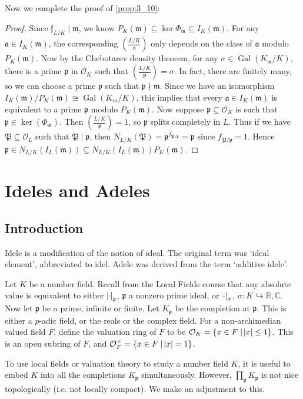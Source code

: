\documentclass[11pt]{article}
\theoremstyle{definition}
\theoremstyle{plain}
\theoremstyle{remark}
\DeclareMathOperator{\Gal}{Gal}
\newcommand{\RR}{\mathbb{R}}
\newcommand{\CC}{\mathbb{C}}
\newcommand{\cO}{\mathcal{O}}
\newcommand{\cp}{\mathfrak{P}}
\newcommand{\fa}{\mathfrak{a}}
\newcommand{\ff}{\mathfrak{f}}
\newcommand{\fp}{\mathfrak{p}}
\newcommand{\fm}{\mathfrak{m}}
\newcommand{\leg}[2]{\left(\frac{#1}{#2}\right)}
\begin{document}
Now we complete the proof of \autoref{prop:3_10}:
\begin{proof}
    Since $\ff_{L/K} \mid \fm$, we know $P_K(\fm) \subseteq \ker \Phi_\fm \subseteq I_K(\fm)$. For any $\fa \in I_K(\fm)$, the corresponding $\leg{L/K}{\fa}$ only depends on the class of $\fa$ modulo $P_K(\fm)$. Now by the Chebotarev density theorem, for any $\sigma \in \Gal(K_\fm / K)$, there is a prime $\fp$ in $\cO_K$ such that $\leg{L/K}{\fp} = \sigma$. In fact, there are finitely many, so we can choose a prime $\fp$ such that $\fp \nmid \fm$. Since we have an isomorphism $I_K(\fm) / P_K(\fm) \cong \Gal(K_m / K)$, this implies that every $\fa \in I_K(\fm)$ is equivalent to a prime $\fp$ modulo $P_K(\fm)$. Now suppose $\fp \subseteq \cO_K$ is such that $\fp \in \ker(\Phi_\fm)$. Then $\leg{L/K}{\fp} = 1$, so $\fp$ splits completely in $L$. Thus if we have $\cp \subseteq \cO_L$ such that $\cp \mid \fp$, then $N_{L/K}(\cp) = \fp^{f_{\cp/\fp}} = \fp$ since $f_{\cp/\fp} = 1$. Hence $\fp \in N_{L/K}(I_L(\fm)) \subseteq N_{L/K}(I_L(\fm)) P_K(\fm)$.
\end{proof}

\section{Ideles and Adeles}

\subsection{Introduction}

Idele is a modification of the notion of ideal. The original term was `ideal element', abbreviated to idel. Adele was derived from the term `additive idele'.

Let $K$ be a number field. Recall from the Local Fields course that any absolute value is equivalent to either $\abs{\cdot}_\fp$, $\fp$ a nonzero prime ideal, or $\abs{\cdot}_\sigma$, $\sigma : K \hookrightarrow \RR, \CC$. Now let $\fp$ be a prime, infinite or finite. Let $K_\fp$ be the completion at $\fp$. This is either a $p$-adic field, or the reals or the complex field. For a non-archimedian valued field $F$, define the valuation ring of $F$ to be $\cO_K = \{x \in F \mid \abs{x} \le 1\}$. This is an open subring of $F$, and $\cO_F^\times = \{x \in F \mid \abs{x} = 1\}$.

To use local fields or valuation theory to study a number field $K$, it is useful to embed $K$ into all the completions $K_\fp$ simultaneously. However, $\prod_\fp K_\fp$ is not nice topologically (i.e. not locally compact). We make an adjustment to this.
\end{document}
